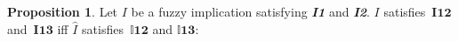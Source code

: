 \documentclass[12pt]{article}
\theoremstyle{plain}
\theoremstyle{remark}
\theoremstyle{definition}
\theoremstyle{proposition}
\newtheorem{proposition}[theorem]{Proposition}
\newcommand{\II}{\mathbb{I} }
\begin{document}
\begin{proposition}\label{cor-prop-int-imp-2}
Let $I$ be a fuzzy implication satisfying \emph{\textbf{I1}} and \emph{\textbf{I2}}. $I$ satisfies~$\mathbf{I12}$ and~$\mathbf{I13}$ iff $\widehat{I}$ satisfies~$\II\mathbf{12}$ and $\II\mathbf{13}$:
\end{proposition}
\end{document}
